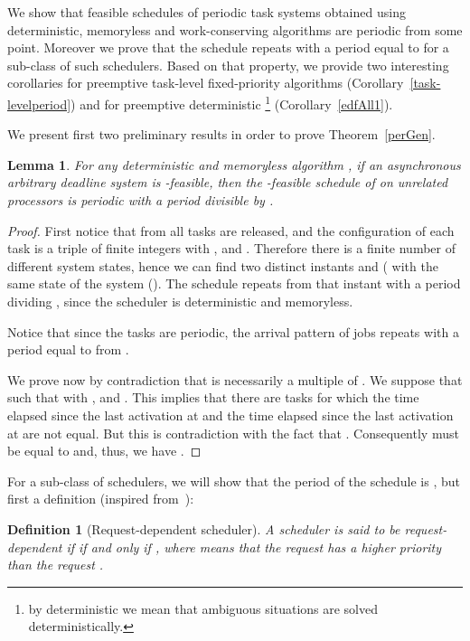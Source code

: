 \documentclass[a4paper,11pt]{article}
\newtheorem{Definition}{Definition}
\newtheorem{Lemma}[Theorem]{Lemma}
\begin{document}
We show that feasible schedules of periodic task systems obtained
using deterministic, memoryless and work-conserving algorithms are
periodic from some point. Moreover we prove that the schedule repeats
with a period equal to  for a sub-class of such schedulers. Based on that property, we provide two
interesting corollaries for preemptive task-level fixed-priority algorithms (Corollary~\ref{task-levelperiod}) and for preemptive deterministic \footnote{by deterministic {} we mean that ambiguous situations are solved deterministically.} (Corollary~\ref{edfAll1}).

We present first two preliminary results in order to prove Theorem~\ref{perGen}.
 
\begin{Lemma}\label{thZero} For any deterministic and memoryless
  algorithm , if an asynchronous arbitrary deadline system 
  is -feasible, then the -feasible schedule of  on 
  unrelated processors is periodic with a period \emph{divisible} by
  . 
\end{Lemma}

\begin{proof}
  First notice that from  all tasks are released,
  and the configuration  of each task is a triple of
  finite integers  with ,  and . Therefore there is a finite number of different system
  states, hence we can find two distinct instants  and 
  ( with the same state of the system
  (). The schedule repeats from that instant
  with a period dividing , since the scheduler is
  deterministic and memoryless.
  
  Notice that since the tasks are periodic, the arrival pattern of jobs repeats with a period equal to  from .

  We prove now by contradiction that  is necessarily a multiple
  of . We suppose that  such
  that  with
  ,  and . This implies that there are tasks for which the time elapsed since the last activation at  and the time elapsed since the last
  activation at  are not equal. But this is contradiction with the fact that . Consequently  must be equal to
   and, thus, we have . 
\end{proof}

For a sub-class of schedulers, we will show that the period of the schedule is , but first a definition (inspired from~\cite{GD99b}):

\begin{Definition}[Request-dependent scheduler]
A scheduler is said to be \emph{request-dependent} if  if and  only if , where  means that the request  has a higher priority than the request .
\end{Definition}
\end{document}
